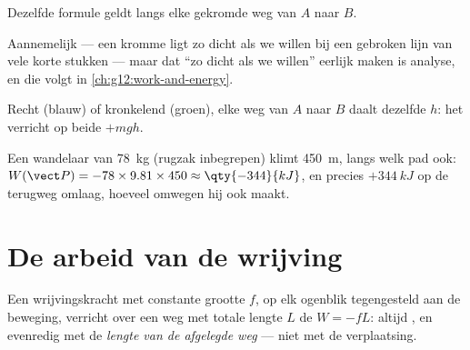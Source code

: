 \begin{proposition}\label{prop:g11:work-of-force:anypath}
Dezelfde formule geldt langs elke gekromde weg van $A$ naar $B$.
\end{proposition}
\admitted

\begin{remark}\label{rem:g11:work-of-force:anypath}
Aannemelijk --- een kromme ligt zo dicht als we willen bij een gebroken
lijn van vele korte stukken --- maar dat ``zo dicht als we willen''
eerlijk maken is analyse, en die volgt in
\cref{ch:g12:work-and-energy}.
\end{remark}

\begin{omfigure}

{\small Recht (blauw) of kronkelend (groen), elke weg van $A$ naar $B$
daalt dezelfde $h$: het  verricht op beide $+mgh$.}
\end{omfigure}

\begin{example}[Wandelaar]\label{ex:g11:work-of-force:hiker}
Een wandelaar van \qty{78}{kg} (rugzak inbegrepen) klimt \qty{450}{m},
langs welk pad ook:
$W(\vect P) = -78 \times 9.81 \times 450 \approx \qty{-344}{kJ}$, en
precies $+\qty{344}{kJ}$ op de terugweg omlaag, hoeveel omwegen hij ook
maakt.
\end{example}

\section{De arbeid van de wrijving}

\begin{proposition}\label{prop:g11:work-of-force:friction}
Een wrijvingskracht met constante grootte $f$, op elk ogenblik
tegengesteld aan de beweging, verricht over een weg met totale lengte $L$
de  $W = -fL$: altijd , en evenredig met de \emph{lengte van
de afgelegde weg} --- niet met de verplaatsing.
\end{proposition}

